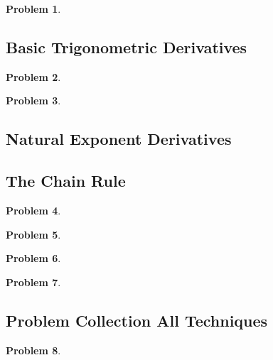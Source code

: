 \documentclass{article}
\newtheorem{problem}{Problem}
\begin{document}
\begin{problem}

\end{problem}

\subsection{Basic Trigonometric Derivatives}\label{secMPStrigDerivatives}
\begin{problem}

\end{problem}
\begin{problem}

\end{problem}
\subsection{Natural Exponent Derivatives}


\subsection{The Chain Rule}\label{secMPSchainRule}

\begin{problem}

\end{problem}


\begin{problem}

\end{problem}


\begin{problem}

\end{problem}
\begin{problem}

\end{problem}
\subsection{Problem Collection All Techniques}
\begin{problem}

\end{problem}

\end{document}

